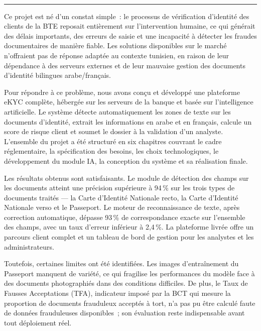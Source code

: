 \documentclass[12pt,a4paper]{report}
\newcommand{\titrespecial}[1]{%
  \noindent{\normalfont\LARGE\bfseries\color{bleu_principal} #1}\\[-0.3em]%
  \noindent\textcolor{bleu_principal}{\rule{\textwidth}{0.8pt}}%
  \vspace{1em}%
}
\begin{document}



\clearpage
\thispagestyle{fancy}

\titrespecial{Conclusion Générale}

Ce projet est né d'un constat simple~: le processus de vérification d'identité des clients de la BTE reposait entièrement sur l'intervention humaine, ce qui générait des délais importants, des erreurs de saisie et une incapacité à détecter les fraudes documentaires de manière fiable. Les solutions disponibles sur le marché n'offraient pas de réponse adaptée au contexte tunisien, en raison de leur dépendance à des serveurs externes et de leur mauvaise gestion des documents d'identité bilingues arabe/français.

Pour répondre à ce problème, nous avons conçu et développé une plateforme eKYC complète, hébergée sur les serveurs de la banque et basée sur l'intelligence artificielle. Le système détecte automatiquement les zones de texte sur les documents d'identité, extrait les informations en arabe et en français, calcule un score de risque client et soumet le dossier à la validation d'un analyste. L'ensemble du projet a été structuré en six chapitres couvrant le cadre réglementaire, la spécification des besoins, les choix technologiques, le développement du module IA, la conception du système et sa réalisation finale.

Les résultats obtenus sont satisfaisants. Le module de détection des champs sur les documents atteint une précision supérieure à 94\,\% sur les trois types de documents traités — la Carte d'Identité Nationale recto, la Carte d'Identité Nationale verso et le Passeport. Le moteur de reconnaissance de texte, après correction automatique, dépasse 93\,\% de correspondance exacte sur l'ensemble des champs, avec un taux d'erreur inférieur à 2,4\,\%. La plateforme livrée offre un parcours client complet et un tableau de bord de gestion pour les analystes et les administrateurs.

Toutefois, certaines limites ont été identifiées. Les images d'entraînement du Passeport manquent de variété, ce qui fragilise les performances du modèle face à des documents photographiés dans des conditions difficiles. De plus, le Taux de Fausses Acceptations (TFA), indicateur imposé par la BCT qui mesure la proportion de documents frauduleux acceptés à tort, n'a pas pu être calculé faute de données frauduleuses disponibles~; son évaluation reste indispensable avant tout déploiement réel.
\end{document}

